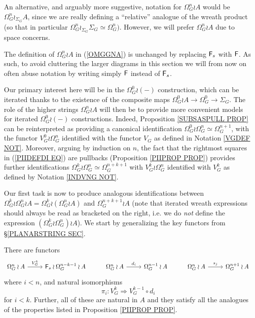 \documentclass[a4paper,10pt]{article}%
\begin{document}
\begin{remark}
An alternative, and arguably more suggestive, notation for 
$\Omega_{G}^n \wr A$ would be $\Omega_{G}^n \wr_{\Sigma_G} A$,
since we are really defining a ``relative'' analogue of the wreath product 
(so that in particular $\Omega_{G}^n \wr_{\Sigma_G} \Sigma_G \simeq \Omega_G^n)$.
However, we will prefer $\Omega_{G}^n \wr A$ due to space concerns.
\end{remark}

\begin{remark}
The definition of $\Omega_{G}^{n} \wr A$ in (\ref{OMGGNA})
is unchanged by replacing $\mathsf{F}_s$ with $\mathsf{F}$. 
As such, to avoid cluttering the larger diagrams in this section we will from now on often abuse notation by writing simply $\mathsf{F}$ instead of $\mathsf{F}_s$.
\end{remark}


Our primary interest here will be in the 
$\Omega_{G}^{0}\wr (\minus)$ construction,
which can be iterated thanks to the existence of the composite maps
$\Omega_{G}^{0} \wr A \to \Omega_{G}^{0} \to \Sigma_G$.
The role of the higher strings $\Omega_{G}^{n} \wr A $ will then be to provide more convenient models for iterated 
$\Omega_{G}^{0}\wr (\minus)$ constructions.
Indeed, Proposition \ref{SUBSASPULL PROP} can be reinterpreted as providing a canonical identification
$\Omega_{G}^{0} \wr \Omega_{G}^{n} \simeq \Omega_{G}^{n+1}$,
with the functor $V_G^0 \wr \Omega_G^n$ identified with the functor $V_G$ as defined in Notation \ref{VGDEF NOT}.
Moreover, arguing by induction on $n$, the fact that the rightmost squares in (\ref{PIIDEFDI EQ}) are pullbacks
(Proposition \ref{PIIPROP PROP})
provides further identifications
$\Omega_{G}^{k} \wr \Omega_{G}^{n} \simeq \Omega_{G}^{n+k+1}$
with $V_G^k \wr \Omega_G^n$ identified with $V_G^k$ as defined by Notation \ref{INDVNG NOT}.

Our first task is now to produce analogous identifications between
$\Omega_{G}^{k} \wr \Omega_{G}^{n} \wr A =
\Omega_{G}^{k} \wr (\Omega_{G}^{n} \wr A)$
and 
$\Omega_{G}^{n+k+1} \wr A$
(note that iterated wreath expressions should always be read as bracketed on the right, i.e. we do \textit{not} define the expression
$ (\Omega_{G}^{k} \wr \Omega_{G}^{n}) \wr A$).
We start by generalizing the key functors from \S \ref{PLANARSTRING SEC}.

\begin{proposition}\label{PIIPROPA PROP}
There are functors
\[
	\begin{tikzcd}
	\Omega_G^n \wr A \ar{r}{V_G^k} & \Fin_s \wr \Omega_G^{n-k-1}\wr A
&
	\Omega_G^n \wr A \ar{r}{d_i} & \Omega_G^{n-1}\wr A
&
	\Omega_G^n \wr A \ar{r}{s_j} & \Omega_G^{n+1}\wr A
	\end{tikzcd}
\]
where $i<n$, and natural isomorphisms 
\[
	\pi_i \colon V_G^k \Rightarrow V_G^{k-1} \circ d_i
\]
for $i < k$.
Further, all of these are natural in $A$
and they satisfy all the analogues of the properties listed in 
Proposition \ref{PIIPROP PROP}.
\end{proposition}
\end{document}
